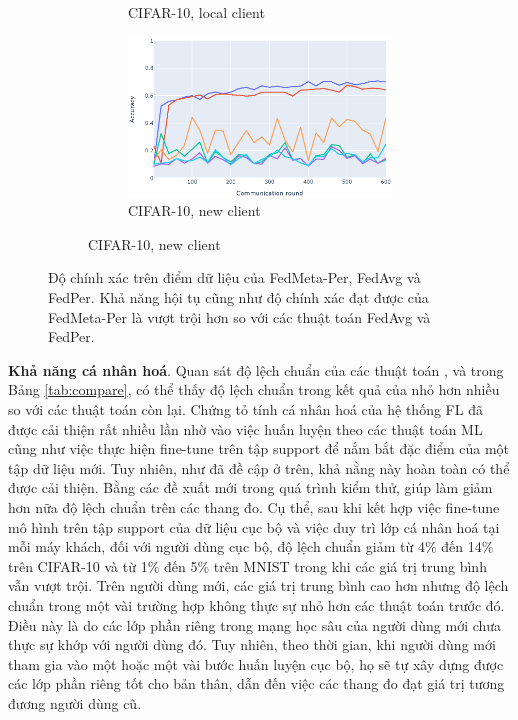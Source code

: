 \documentclass[runningheads]{llncs}
\begin{document}
\begin{figure}[h]
\begin{subfigure}{\textwidth}
\begin{subfigure}{.49\textwidth}
            \caption{CIFAR-10, local client}\label{cifar_old_per}
        \end{subfigure}
        \begin{subfigure}{.49\textwidth}
            \includegraphics[width=\linewidth]{img/cifar_new_per.eps}
            \caption{CIFAR-10, new client}\label{cifar_new_per}
        \end{subfigure}
    \end{subfigure}
    \caption{Độ chính xác trên điểm dữ liệu của FedMeta-Per, FedAvg và FedPer. Khả năng hội tụ cũng như độ chính xác đạt được của FedMeta-Per là vượt trội hơn so với các thuật toán FedAvg và FedPer.} \label{fig:fedpermeta_vs_chicken}
\end{figure}

\textbf{Khả năng cá nhân hoá}. Quan sát độ lệch chuẩn của các thuật toán ,  và  trong Bảng \ref{tab:compare}, có thể thấy độ lệch chuẩn trong kết quả của  nhỏ hơn nhiều so với các thuật toán còn lại. Chứng tỏ tính cá nhân hoá của hệ thống FL đã được cải thiện rất nhiều lần nhờ vào việc huấn luyện theo các thuật toán ML cũng như việc thực hiện fine-tune trên tập support để nắm bắt đặc điểm của một tập dữ liệu mới. Tuy nhiên, như đã đề cập ở trên, khả nằng này hoàn toàn có thể được cải thiện. Bằng các đề xuất mới trong quá trình kiểm thử,  giúp làm giảm hơn nữa độ lệch chuẩn trên các thang đo. Cụ thể, sau khi kết hợp việc fine-tune mô hình trên tập support của dữ liệu cục bộ và việc duy trì lớp cá nhân hoá tại mỗi máy khách, đối với người dùng cục bộ, độ lệch chuẩn giảm từ 4\% đến 14\% trên CIFAR-10 và từ 1\% đến 5\% trên MNIST trong khi các giá trị trung bình vẫn vượt trội. Trên người dùng mới, các giá trị trung bình cao hơn nhưng độ lệch chuẩn trong một vài trường hợp không thực sự nhỏ hơn các thuật toán trước đó. Điều này là do các lớp phần riêng trong mạng học sâu của người dùng mới chưa thực sự khớp với người dùng đó. Tuy nhiên, theo thời gian, khi người dùng mới tham gia vào một hoặc một vài bước huấn luyện cục bộ, họ sẽ tự xây dựng được các lớp phần riêng tốt cho bản thân, dẫn đến việc các thang đo đạt giá trị tương đương người dùng cũ.
\end{document}
